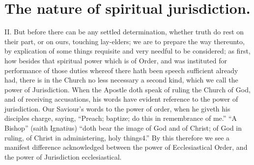 \section*{The nature of spiritual jurisdiction.}

II. But before there can be any settled determination, whether truth do rest on their part, or on ours, touching lay-elders; we are to prepare the way thereunto, by explication of some things requisite and very needful to be considered; as first, how besides that spiritual power which is of Order, and was instituted for performance of those duties whereof there hath been speech sufficient already had, there is in the Church no less necessary a second kind, which we call the power of Jurisdiction. When the Apostle doth speak of ruling the Church of God, and of receiving accusations, his words have evident reference to the power of jurisdiction. Our Saviour’s words to the power of order, when he giveth his disciples charge, saying, “Preach; baptize; do this in remembrance of me.” “A Bishop” (saith Ignatius) “doth bear the image of God and of Christ; of God in ruling, of Christ in administering, holy things4.” By this therefore we see a manifest difference acknowledged between the power of Ecclesiastical Order, and the power of Jurisdiction ecclesiastical.

